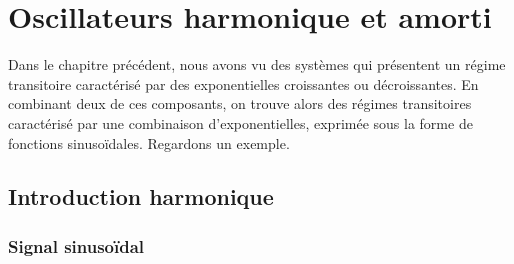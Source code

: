 \documentclass[../main/main.tex]{subfiles}
\begin{document}
\setcounter{chapter}{3}

\chapter{Oscillateurs harmonique et amorti}

Dans le chapitre précédent, nous avons vu des systèmes qui présentent un régime
transitoire caractérisé par des exponentielles croissantes ou décroissantes. En
combinant deux de ces composants, on trouve alors des régimes transitoires
caractérisé par une combinaison d'exponentielles, exprimée sous la forme de
fonctions sinusoïdales. Regardons un exemple.

\section{Introduction harmonique}

\subsection{Signal sinusoïdal}
\end{document}

